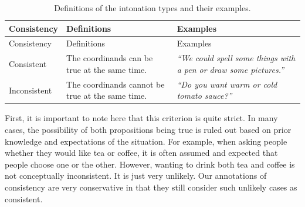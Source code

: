 \documentclass[oneside]{report}
\theoremstyle{definition}
\theoremstyle{definition}
\theoremstyle{definition}
\theoremstyle{remark}
\begin{document}
\begin{longtable}[]{@{}lll@{}}
\caption{\label{tab:consistencyType} Definitions of the intonation types and
their examples.}\tabularnewline
\toprule
\begin{minipage}[b]{0.20\columnwidth}\raggedright\strut
Consistency\strut
\end{minipage} & \begin{minipage}[b]{0.16\columnwidth}\raggedright\strut
Definitions\strut
\end{minipage} & \begin{minipage}[b]{0.42\columnwidth}\raggedright\strut
Examples\strut
\end{minipage}\tabularnewline
\midrule
\endfirsthead
\toprule
\begin{minipage}[b]{0.20\columnwidth}\raggedright\strut
Consistency\strut
\end{minipage} & \begin{minipage}[b]{0.16\columnwidth}\raggedright\strut
Definitions\strut
\end{minipage} & \begin{minipage}[b]{0.42\columnwidth}\raggedright\strut
Examples\strut
\end{minipage}\tabularnewline
\midrule
\endhead
\begin{minipage}[t]{0.20\columnwidth}\raggedright\strut
Consistent\strut
\end{minipage} & \begin{minipage}[t]{0.16\columnwidth}\raggedright\strut
The coordinands can be true at the same time.\strut
\end{minipage} & \begin{minipage}[t]{0.42\columnwidth}\raggedright\strut
\emph{``We could spell some things with a pen or draw some
pictures.''}\strut
\end{minipage}\tabularnewline
\begin{minipage}[t]{0.20\columnwidth}\raggedright\strut
Inconsistent\strut
\end{minipage} & \begin{minipage}[t]{0.16\columnwidth}\raggedright\strut
The coordinands cannot be true at the same time.\strut
\end{minipage} & \begin{minipage}[t]{0.42\columnwidth}\raggedright\strut
\emph{``Do you want warm or cold tomato sauce?''}\strut
\end{minipage}\tabularnewline
\bottomrule
\end{longtable}
First, it is important to note here that this criterion is quite strict.
In many cases, the possibility of both propositions being true is ruled
out based on prior knowledge and expectations of the situation. For
example, when asking people whether they would like tea or coffee, it is
often assumed and expected that people choose one or the other. However,
wanting to drink both tea and coffee is not conceptually inconsistent.
It is just very unlikely. Our annotations of consistency are very
conservative in that they still consider such unlikely cases as
consistent.
\end{document}
